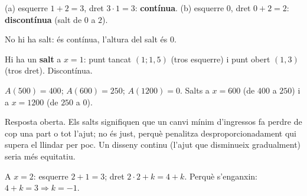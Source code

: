 \begin{solucions}
\begin{sollist}
  \item (a) esquerre $1+2=3$, dret $3\cdot 1=3$: \textbf{contínua}. \quad
        (b) esquerre $0$, dret $0+2=2$: \textbf{discontínua} (salt de $0$ a $2$).
  \item No hi ha salt: és contínua, l'altura del salt és $0$.
  \item Hi ha un \textbf{salt} a $x=1$: punt tancat $(1;1,5)$ (tros esquerre) i punt
        obert $(1,3)$ (tros dret). Discontínua.
  \item $A(500)=400$; $A(600)=250$; $A(\num{1200})=0$. Salts a $x=600$ (de $400$ a
        $250$) i a $x=\num{1200}$ (de $250$ a $0$).
  \item Resposta oberta. Els salts signifiquen que un canvi mínim d'ingressos fa perdre
        de cop una part o tot l'ajut; no és just, perquè penalitza desproporcionadament
        qui supera el llindar per poc. Un disseny continu (l'ajut que disminueix
        gradualment) seria més equitatiu.
  \item A $x=2$: esquerre $2+1=3$; dret $2\cdot 2+k=4+k$. Perquè s'enganxin:
        $4+k=3\Rightarrow k=-1$.
\end{sollist}
\end{solucions}
